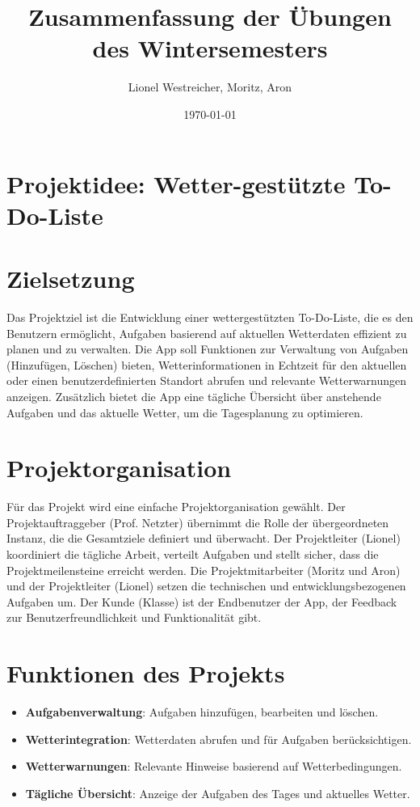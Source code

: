 \documentclass[a4paper,12pt]{article}
\title{Zusammenfassung der Übungen des Wintersemesters}
\author{  Lionel Westreicher, Moritz, Aron}
\date{\today}
\begin{document}
\maketitle

\tableofcontents

\newpage

\section{Projektidee: Wetter-gestützte To-Do-Liste}

\section{Zielsetzung}
Das Projektziel ist die Entwicklung einer wettergestützten To-Do-Liste, die es den Benutzern ermöglicht, Aufgaben basierend auf aktuellen Wetterdaten effizient zu planen und zu verwalten. Die App soll Funktionen zur Verwaltung von Aufgaben (Hinzufügen, Löschen) bieten, Wetterinformationen in Echtzeit für den aktuellen oder einen benutzerdefinierten Standort abrufen und relevante Wetterwarnungen anzeigen. Zusätzlich bietet die App eine tägliche Übersicht über anstehende Aufgaben und das aktuelle Wetter, um die Tagesplanung zu optimieren.

\section{Projektorganisation}
Für das Projekt wird eine einfache Projektorganisation gewählt. Der Projektauftraggeber (Prof. Netzter) übernimmt die Rolle der übergeordneten Instanz, die die Gesamtziele definiert und überwacht. Der Projektleiter (Lionel) koordiniert die tägliche Arbeit, verteilt Aufgaben und stellt sicher, dass die Projektmeilensteine erreicht werden. Die Projektmitarbeiter (Moritz und Aron) und der Projektleiter (Lionel) setzen die technischen und entwicklungsbezogenen Aufgaben um. Der Kunde (Klasse) ist der Endbenutzer der App, der Feedback zur Benutzerfreundlichkeit und Funktionalität gibt.

\section{Funktionen des Projekts}
\begin{itemize}
    \item \textbf{Aufgabenverwaltung}: Aufgaben hinzufügen, bearbeiten und löschen.
    \item \textbf{Wetterintegration}: Wetterdaten abrufen und für Aufgaben berücksichtigen.
    \item \textbf{Wetterwarnungen}: Relevante Hinweise basierend auf Wetterbedingungen.
    \item \textbf{Tägliche Übersicht}: Anzeige der Aufgaben des Tages und aktuelles Wetter.
\end{itemize}
\end{document}
